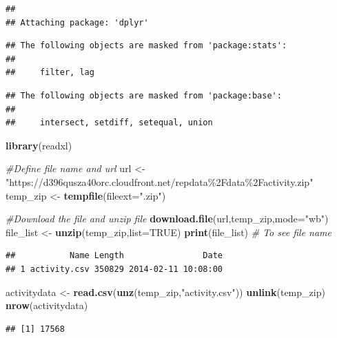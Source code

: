\documentclass[
]{article}
\newenvironment{Shaded}{\begin{snugshade}}{\end{snugshade}}
\newcommand{\AttributeTok}[1]{\textcolor[rgb]{0.13,0.29,0.53}{#1}}
\newcommand{\CommentTok}[1]{\textcolor[rgb]{0.56,0.35,0.01}{\textit{#1}}}
\newcommand{\ConstantTok}[1]{\textcolor[rgb]{0.56,0.35,0.01}{#1}}
\newcommand{\FunctionTok}[1]{\textcolor[rgb]{0.13,0.29,0.53}{\textbf{#1}}}
\newcommand{\NormalTok}[1]{#1}
\newcommand{\OtherTok}[1]{\textcolor[rgb]{0.56,0.35,0.01}{#1}}
\newcommand{\StringTok}[1]{\textcolor[rgb]{0.31,0.60,0.02}{#1}}
\begin{document}
\begin{verbatim}
## 
## Attaching package: 'dplyr'
\end{verbatim}

\begin{verbatim}
## The following objects are masked from 'package:stats':
## 
##     filter, lag
\end{verbatim}

\begin{verbatim}
## The following objects are masked from 'package:base':
## 
##     intersect, setdiff, setequal, union
\end{verbatim}

\begin{Shaded}
\begin{Highlighting}[]
\FunctionTok{library}\NormalTok{(readxl)}

\CommentTok{\#Define file name and url}
\NormalTok{url }\OtherTok{\textless{}{-}} \StringTok{"https://d396qusza40orc.cloudfront.net/repdata\%2Fdata\%2Factivity.zip"}
\NormalTok{temp\_zip }\OtherTok{\textless{}{-}} \FunctionTok{tempfile}\NormalTok{(}\AttributeTok{fileext=}\StringTok{".zip"}\NormalTok{)}

\CommentTok{\#Download the file and unzip file}
\FunctionTok{download.file}\NormalTok{(url,temp\_zip,}\AttributeTok{mode=}\StringTok{"wb"}\NormalTok{)}
\NormalTok{file\_list }\OtherTok{\textless{}{-}} \FunctionTok{unzip}\NormalTok{(temp\_zip,}\AttributeTok{list=}\ConstantTok{TRUE}\NormalTok{)}
\FunctionTok{print}\NormalTok{(file\_list) }\CommentTok{\# To see file name}
\end{Highlighting}
\end{Shaded}

\begin{verbatim}
##           Name Length                Date
## 1 activity.csv 350829 2014-02-11 10:08:00
\end{verbatim}

\begin{Shaded}
\begin{Highlighting}[]
\NormalTok{activitydata }\OtherTok{\textless{}{-}} \FunctionTok{read.csv}\NormalTok{(}\FunctionTok{unz}\NormalTok{(temp\_zip,}\StringTok{"activity.csv"}\NormalTok{))}
\FunctionTok{unlink}\NormalTok{(temp\_zip)}
\FunctionTok{nrow}\NormalTok{(activitydata)}
\end{Highlighting}
\end{Shaded}

\begin{verbatim}
## [1] 17568
\end{verbatim}
\end{document}
